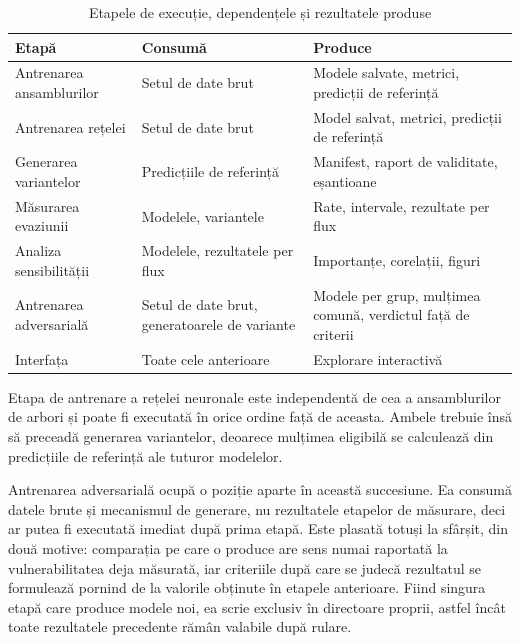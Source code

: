 \begin{table}[H]
    \caption{Etapele de execuție, dependențele și rezultatele produse}
    \centering
    \begin{tabular}{|l|p{3.3cm}|p{4.2cm}|}
        \hline
        \textbf{Etapă} & \textbf{Consumă} & \textbf{Produce} \\
        \hline
        Antrenarea ansamblurilor & Setul de date brut & Modele salvate, metrici, predicții de referință \\
        \hline
        Antrenarea rețelei & Setul de date brut & Model salvat, metrici, predicții de referință \\
        \hline
        Generarea variantelor & Predicțiile de referință & Manifest, raport de validitate, eșantioane \\
        \hline
        Măsurarea evaziunii & Modelele, variantele & Rate, intervale, rezultate per flux \\
        \hline
        Analiza sensibilității & Modelele, rezultatele per flux & Importanțe, corelații, figuri \\
        \hline
        Antrenarea adversarială & Setul de date brut, generatoarele de variante & Modele per grup, mulțimea comună, verdictul față de criterii \\
        \hline
        Interfața & Toate cele anterioare & Explorare interactivă \\
        \hline
    \end{tabular}
    \label{tab:etape}
\end{table}

Etapa de antrenare a rețelei neuronale este independentă de cea a ansamblurilor de arbori și poate fi executată în orice ordine față de aceasta. Ambele trebuie însă să preceadă generarea variantelor, deoarece mulțimea eligibilă se calculează din predicțiile de referință ale tuturor modelelor.

Antrenarea adversarială ocupă o poziție aparte în această succesiune. Ea consumă datele brute și mecanismul de generare, nu rezultatele etapelor de măsurare, deci ar putea fi executată imediat după prima etapă. Este plasată totuși la sfârșit, din două motive: comparația pe care o produce are sens numai raportată la vulnerabilitatea deja măsurată, iar criteriile după care se judecă rezultatul se formulează pornind de la valorile obținute în etapele anterioare. Fiind singura etapă care produce modele noi, ea scrie exclusiv în directoare proprii, astfel încât toate rezultatele precedente rămân valabile după rulare.

